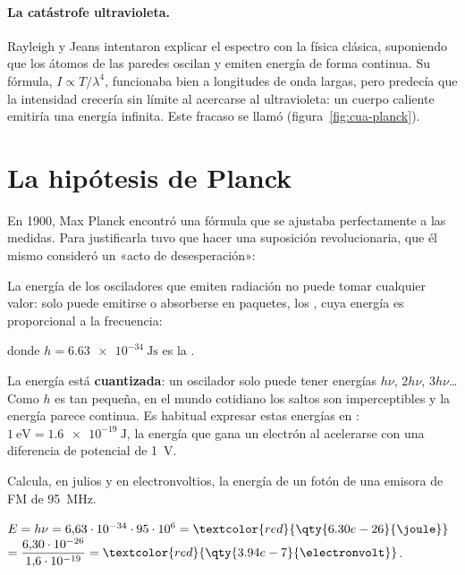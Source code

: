 \paragraph{La catástrofe ultravioleta.} Rayleigh y Jeans intentaron explicar el espectro con la física clásica, suponiendo que los
átomos de las paredes oscilan y emiten energía de forma continua. Su fórmula, \(I \propto T/\lambda^4\), funcionaba bien a longitudes de
onda largas, pero predecía que la intensidad crecería sin límite al acercarse al ultravioleta: un cuerpo caliente emitiría una
energía infinita. Este fracaso se llamó  (figura~\ref{fig:cua-planck}).

\section{La hipótesis de Planck}\label{sec:cua-planck}

En 1900, Max Planck encontró una fórmula que se ajustaba perfectamente a las medidas. Para justificarla tuvo que hacer una suposición
revolucionaria, que él mismo consideró un «acto de desesperación»:

\begin{definition}
    La energía de los osciladores que emiten radiación no puede tomar cualquier valor: solo puede emitirse o absorberse en paquetes,
    los , cuya energía es proporcional a la frecuencia:
    \begin{centeredequation}
         \label{eq:cua-planck}
    \end{centeredequation}
    donde \(h = \qty{6.63e-34}{\joule\second}\) es la .
\end{definition}

La energía está \textbf{cuantizada}: un oscilador solo puede tener energías \(h\nu\), \(2h\nu\), \(3h\nu\)\ldots{} Como \(h\) es
tan pequeña, en el mundo cotidiano los saltos son imperceptibles y la energía parece continua. Es habitual expresar estas energías en
: \(\qty{1}{\electronvolt} = \qty{1.6e-19}{\joule}\), la energía que gana un electrón al acelerarse con una
diferencia de potencial de \qty{1}{\volt}.

\begin{exercise}
    Calcula, en julios y en electronvoltios, la energía de un fotón de una emisora de FM de \qty{95}{\mega\hertz}.
    \begin{solu}
        \(E = h\nu = 6{,}63\cdot 10^{-34}\cdot 95\cdot 10^6 = \textcolor{red}{\qty{6.30e-26}{\joule}}\) \(= \dfrac{6{,}30\cdot 10^{-26}}{1{,}6\cdot 10^{-19}} = \textcolor{red}{\qty{3.94e-7}{\electronvolt}}\).
    \end{solu}
\end{exercise}

